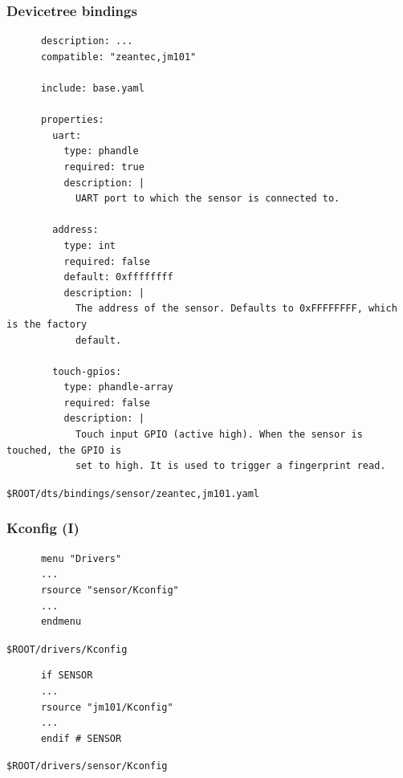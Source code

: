 \documentclass[handout]{beamer}
\begin{document}
\begin{frame}[fragile]
  \frametitle{Devicetree bindings}

  \begin{listing}[H]
    \begin{verbatim}
      description: ...
      compatible: "zeantec,jm101"

      include: base.yaml

      properties:
        uart:
          type: phandle
          required: true
          description: |
            UART port to which the sensor is connected to.

        address:
          type: int
          required: false
          default: 0xffffffff
          description: |
            The address of the sensor. Defaults to 0xFFFFFFFF, which is the factory
            default.

        touch-gpios:
          type: phandle-array
          required: false
          description: |
            Touch input GPIO (active high). When the sensor is touched, the GPIO is
            set to high. It is used to trigger a fingerprint read.

    \end{verbatim}
    \caption{\texttt{\$ROOT/dts/bindings/sensor/zeantec,jm101.yaml}}
  \end{listing}
\end{frame}

\begin{frame}[fragile]
  \frametitle{Kconfig (I)}

  \begin{listing}[H]
    \begin{verbatim}
      menu "Drivers"
      ...
      rsource "sensor/Kconfig"
      ...
      endmenu
    \end{verbatim}
    \caption{\texttt{\$ROOT/drivers/Kconfig}}
  \end{listing}

  \begin{listing}[H]
    \begin{verbatim}
      if SENSOR
      ...
      rsource "jm101/Kconfig"
      ...
      endif # SENSOR
    \end{verbatim}
    \caption{\texttt{\$ROOT/drivers/sensor/Kconfig}}
  \end{listing}
\end{frame}
\end{document}

